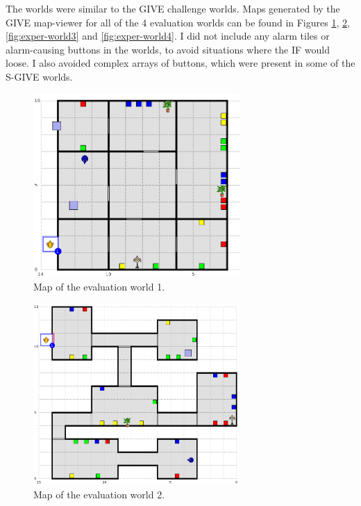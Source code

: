 The worlds were similar to the GIVE challenge worlds. Maps generated by the GIVE map-viewer for all of the 4 evaluation worlds can be found in Figures \ref{fig:exper-world1}, \ref{fig:exper-world2}, \ref{fig:exper-world3} and \ref{fig:exper-world4}. I did not include any alarm tiles or alarm-causing buttons in the worlds, to avoid situations where the IF would loose. I also avoided complex arrays of buttons, which were present in some of the S-GIVE worlds.

\begin{figure}[!htbp]
  \centering
	\includegraphics[width=0.7\textwidth]{Images/experiment-world-2}
	\caption{Map of the evaluation world 1.}
	\label{fig:exper-world1}
\end{figure}

\begin{figure}[!htbp]
  \centering
	\includegraphics[width=0.7\textwidth]{Images/experiment-world-3}
	\caption{Map of the evaluation world 2.}
	\label{fig:exper-world2}
\end{figure}

